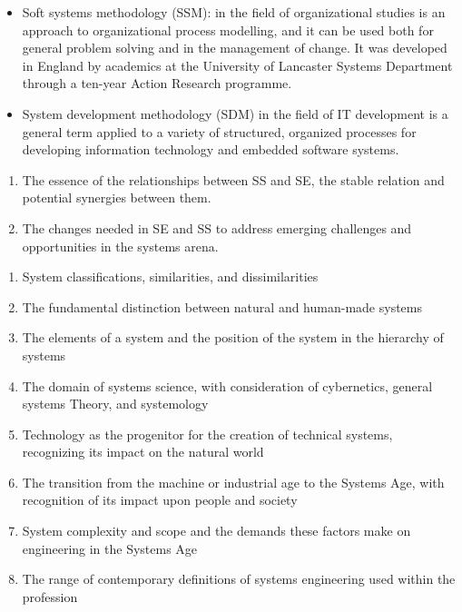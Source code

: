 \begin{itemize}
	\item Soft systems methodology (SSM): in the field of organizational studies is an approach to organizational process modelling, and it can be used both for general problem solving and in the management of change. It was developed in England by academics at the University of Lancaster Systems Department through a ten-year Action Research programme.
	\item System development methodology (SDM) in the field of IT development is a general term applied to a variety of structured, organized processes for developing information technology and embedded software systems.
\end{itemize}

\begin{enumerate}
	\item The essence of the relationships between SS and SE, the stable relation and potential synergies between them.
	\item The changes needed in SE and SS to address emerging challenges and opportunities in the systems arena.
\end{enumerate}

\begin{enumerate}
	\item System classifications, similarities, and dissimilarities
	\item The fundamental distinction between natural and human-made systems
	\item The elements of a system and the position of the system in the hierarchy of systems
	\item The domain of systems science, with consideration of cybernetics, general systems Theory, and systemology
	\item Technology as the progenitor for the creation of technical systems, recognizing its impact on the natural world
	\item The transition from the machine or industrial age to the Systems Age, with recognition of its impact upon people and society
	\item System complexity and scope and the demands these factors make on engineering in the Systems Age
	\item The range of contemporary definitions of systems engineering used within the profession
\end{enumerate}

